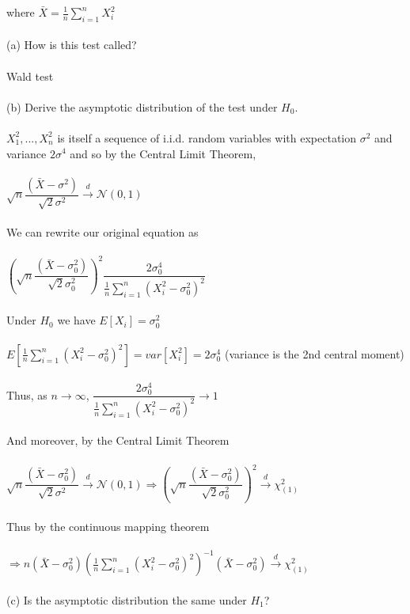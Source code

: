\documentclass{article}
\begin{document}
where $\bar{X}=\frac{1}{n}\sum_{i=1}^nX_i^2$\\\\
(a) How is this test called?\\\\
Wald test\\\\
(b) Derive the asymptotic distribution of the test under $H_0$.\\\\
$X_1^2,...,X_n^2$ is itself a sequence of i.i.d. random variables with expectation $\sigma^2$ and variance $2\sigma^4$ and so by the Central Limit Theorem,\\\\
$\sqrt{n}\dfrac{(\bar{X}-\sigma^2)}{\sqrt{2}\sigma^2}\xrightarrow{d}\mathcal{N}(0,1)$\\\\
We can rewrite our original equation as\\\\
$(\sqrt{n}\dfrac{(\bar{X}-\sigma_0^2)}{\sqrt{2}\sigma_0^2})^2\dfrac{2\sigma_0^4}{\frac{1}{n}\sum_{i=1}^n(X_i^2-\sigma_0^2)^2}$\\\\
Under $H_0$ we have $E[X_i]=\sigma_0^2$\\\\
$E[\frac{1}{n}\sum_{i=1}^n(X_i^2-\sigma_0^2)^2]=var[X_i^2]=2\sigma_0^4$ (variance is the 2nd central moment)\\\\
Thus, as $n\rightarrow\infty$, $\dfrac{2\sigma_0^4}{\frac{1}{n}\sum_{i=1}^n(X_i^2-\sigma_0^2)^2}\rightarrow1$\\\\
And moreover, by the Central Limit Theorem\\\\
$\sqrt{n}\dfrac{(\bar{X}-\sigma_0^2)}{\sqrt{2}\sigma^2}\xrightarrow{d}\mathcal{N}(0,1)\Rightarrow(\sqrt{n}\dfrac{(\bar{X}-\sigma_0^2)}{\sqrt{2}\sigma_0^2})^2\xrightarrow{d}\chi_{(1)}^2$\\\\
Thus by the continuous mapping theorem\\\\
$\Rightarrow n(\bar{X}-\sigma_0^2)(\frac{1}{n}\sum_{i=1}^n(X_i^2-\sigma_0^2)^2)^{-1}(\bar{X}-\sigma_0^2)\xrightarrow{d}\chi_{(1)}^2$\\\\
(c) Is the asymptotic distribution the same under $H_1$?\\\\
\end{document}
